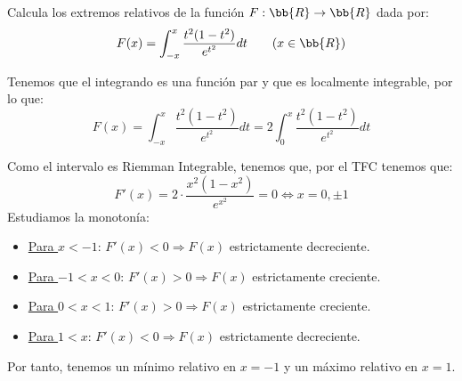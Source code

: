 \documentclass[12pt]{article}
\begin{document}
\begin{ejercicio}
    Calcula los extremos relativos de la función $F:\bb{R}\to \bb{R}$ dada por:
    \begin{equation*}
        F(x)=\int_{-x}^x \frac{t^2(1-t^2)}{e^{t^2}} dt \qquad (x\in \bb{R})
    \end{equation*}

    Tenemos que el integrando es una función par y que es localmente integrable, por lo que:
    \begin{equation*}
        F(x)=\int_{-x}^x \frac{t^2(1-t^2)}{e^{t^2}} dt
        = 2\int^{x}_0 \frac{t^2(1-t^2)}{e^{t^2}} dt
    \end{equation*}

    Como el intervalo es Riemman Integrable, tenemos que, por el TFC tenemos que:
    \begin{equation*}
        F'(x)=2\cdot \frac{x^2(1-x^2)}{e^{x^2}} = 0\Longleftrightarrow x=0,\pm 1
    \end{equation*}
    Estudiamos la monotonía:
    \begin{itemize}
        \item \underline{Para $x<-1$}: $F'(x)<0 \Longrightarrow F(x)$ estrictamente decreciente.
        \item \underline{Para $-1<x<0$}: $F'(x)>0 \Longrightarrow F(x)$ estrictamente creciente.
        \item \underline{Para $0<x<1$}: $F'(x)>0 \Longrightarrow F(x)$ estrictamente creciente.
        \item \underline{Para $1<x$}: $F'(x)<0 \Longrightarrow F(x)$ estrictamente decreciente.
    \end{itemize}

    Por tanto, tenemos un mínimo relativo en $x=-1$ y un máximo relativo en $x=1$.
\end{ejercicio}
\end{document}
